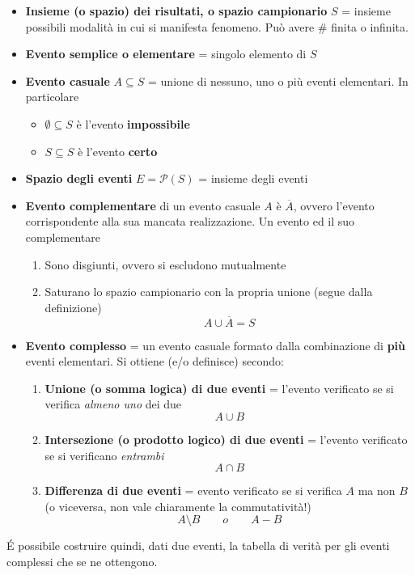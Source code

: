 \documentclass[10pt, oneside]{book}
\begin{document}
\begin{itemize}
\item \textbf{Insieme (o spazio) dei risultati, o spazio campionario} $S$ = insieme possibili modalità in cui si manifesta fenomeno. Può avere $\#$ finita o infinita.
\item \textbf{Evento semplice o elementare} = singolo elemento di $S$
\item \textbf{Evento casuale} $A \subseteq S$ = unione di nessuno, uno o più eventi elementari. In particolare
\begin{itemize}
\item $\emptyset \subseteq S$ è l'evento \textbf{impossibile}
\item $S \subseteq S$ è l'evento \textbf{certo}
\end{itemize}
\item \textbf{Spazio degli eventi} $E = \mathcal{P}(S)$ = insieme degli eventi
\item \textbf{Evento complementare} di un evento casuale $A$ è $\overline{A}$, ovvero l'evento corrispondente alla sua mancata realizzazione. Un evento ed il suo complementare
\begin{enumerate}
\item Sono disgiunti, ovvero si escludono mutualmente
\item Saturano lo spazio campionario con la propria unione (segue dalla definizione)
\[A \cup \overline{A} = S\]
\end{enumerate}
\item \textbf{Evento complesso} = un evento casuale formato dalla combinazione di \textbf{più} eventi elementari. Si ottiene (e/o definisce) secondo:
\begin{enumerate}
\item \textbf{Unione (o somma logica) di due eventi} = l'evento verificato se si verifica \textit{almeno uno} dei due
\[A \cup B\]
\item \textbf{Intersezione (o prodotto logico) di due eventi} = l'evento verificato se si verificano \textit{entrambi}
\[A \cap B\]
\item \textbf{Differenza di due eventi} = evento verificato se si verifica $A$ ma non $B$ (o viceversa, non vale chiaramente la commutatività!)
\[A \setminus B \qquad o \qquad A - B\]
\end{enumerate}
\end{itemize}
\'E possibile costruire quindi, dati due eventi, la tabella di verità per gli eventi complessi che se ne ottengono.
\end{document}
